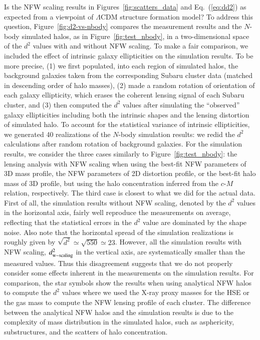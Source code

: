 \documentclass[iop, apj]{emulateapj}
\newcommand{\?}{\stackrel{?}{=}}
\begin{document}
%
Is the NFW scaling results in Figures~\ref{fig:scatters_data} and
Eq.~(\ref{eq:dd2}) as expected from a viewpoint of $\Lambda$CDM
structure formation model?  To address this question,
Figure~\ref{fig:d2-vs-nbody} compares the measurement results and the
$N$-body simulated halos, as in Figure~\ref{fig:test_nbody}, in a
two-dimensional space of the $d^2$ values with and without NFW
scaling. To make a fair comparison, we included the effect of intrinsic
galaxy ellipticities on the simulation results. To be more precise, (1)
we first populated, into each region of simulated halos, the background
galaxies taken from the corresponding Subaru cluster data (matched in
descending order of halo masses), (2) made a random rotation of
orientation of each galaxy ellipticity, which erases the coherent
lensing signal of each Subaru cluster, and (3) then computed the $d^2$
values after simulating the ``observed'' galaxy ellipticities including
both the intrinsic shapes and the lensing distortion of simulated halo.
To account for the statistical variance of intrinsic ellipticities, we
generated 40 realizations of the $N$-body simulation results: we redid
the $d^2$ calculations after random rotation of background galaxies.
For the simulation results, we consider the three cases similarly to
Figure~\ref{fig:test_nbody}: the lensing analysis with NFW scaling when
using the best-fit NFW parameters of 3D mass profile, the NFW parameters
of 2D distortion profile, or the best-fit halo mass of 3D profile, but
using the halo concentration inferred from the $c$-$M$ relation,
respectively. The third case is closest to what we did for the actual
data.  First of all, the simulation results without NFW scaling, denoted
by the $d^2$ values in the horizontal axis, fairly well reproduce the
measurements on average, reflecting that the statistical errors in the
$d^2$ value are dominated by the shape noise. Also note that the
horizontal spread of the simulation realizations is roughly given by
$\sqrt{d^2}\simeq \sqrt{550}\simeq 23$.  However, all the simulation
results with NFW scaling, $d^2_{\rm w-scaling}$ in the vertical axis,
are systematically smaller than the measured values.  Thus this
disagreement suggests that we do not properly consider some effects
inherent in the measurements on the simulation results.  For comparison,
the star symbols show the results when using analytical NFW halos to
compute the $d^2$ values where we used the X-ray proxy masses for
the HSE or the gas mass to compute the NFW lensing profile of each
cluster.  The difference between the analytical NFW halos and the
simulation results is due to the complexity of mass distribution in the
simulated halos, such as asphericity, substructures, and the scatters of
halo concentration.
\end{document}
